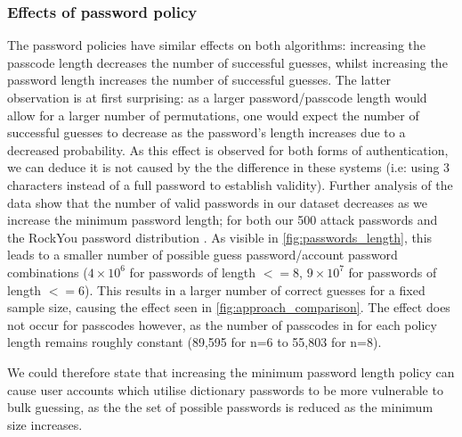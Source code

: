 \documentclass[british,11pt,a4paper]{article}
\begin{document}
\subsubsection{Effects of password policy}
The password policies have similar effects on both algorithms: increasing the passcode length decreases the number of successful guesses, whilst increasing the password length increases the number of successful guesses. The latter observation is at first surprising: as a larger password/passcode length would allow for a larger number of permutations, one would expect the number of successful guesses to decrease as the password's length increases due to a decreased probability. As this effect is observed for both forms of authentication, we can deduce it is not caused by the the difference in these systems (i.e: using 3 characters instead of a full password to establish validity). Further analysis of the data show that the number of valid passwords in our dataset decreases as we increase the minimum password length; for both our 500 attack passwords and the RockYou password distribution \cite{Cubrilovic2009-wu}. As visible in \autoref{fig:passwords_length}, this leads to a smaller number of possible guess password/account password combinations ($4 \times 10^6 $ for  passwords  of length $<= 8$, $9 \times 10^7$ for passwords of length $<= 6$). This results in a larger number of correct guesses for a fixed sample size, causing the effect seen in \autoref{fig:approach_comparison}. The effect does not occur for passcodes however, as the number of passcodes in \cite{Cubrilovic2009-wu} for each policy length remains roughly constant (89,595 for n=6 to 55,803 for n=8). 

We could therefore state that increasing the minimum password length policy can cause user accounts which utilise dictionary passwords to be more vulnerable to bulk guessing, as the the set of possible passwords is reduced as the minimum size increases.





\end{document}
